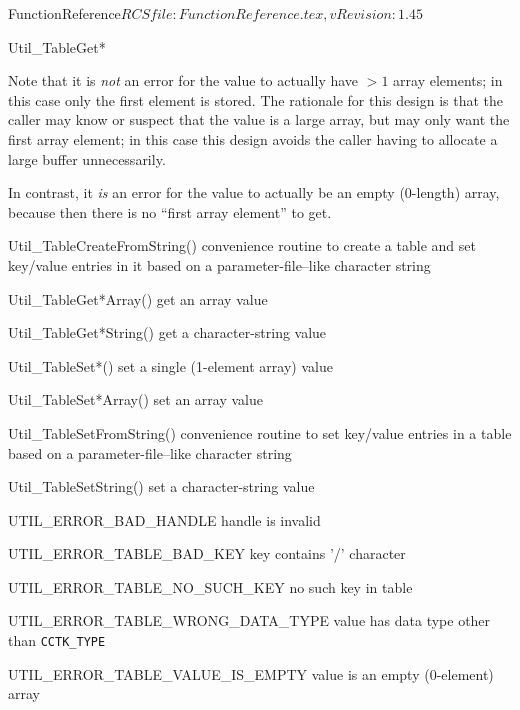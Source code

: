 \begin{cactuspart}{5}{FunctionReference}{$RCSfile: FunctionReference.tex,v $}{$Revision: 1.45 $}
\begin{FunctionDescription}{Util\_TableGet*}
\begin{Discussion}
Note that it is {\em not\/} an error for the value to actually have
$> 1$ array elements; in this case only the first element is stored.
The rationale for this design is that the caller may know or suspect
that the value is a large array, but may only want the first array
element; in this case this design avoids the caller having to allocate
a large buffer unnecessarily.

In contrast, it {\em is\/} an error for the value to actually be
an empty (0-length) array, because then there is no ``first array element''
to get.
\end{Discussion}

\begin{SeeAlso}{Util\_TableCreateFromString()}
convenience routine to create a table and set key/value entries
in it based on a parameter-file--like character string
\end{SeeAlso}
\begin{SeeAlso}{Util\_TableGet*Array()}
get an array value
\end{SeeAlso}
\begin{SeeAlso}{Util\_TableGet*String()}
get a character-string value
\end{SeeAlso}
\begin{SeeAlso}{Util\_TableSet*()}
set a single (1-element array) value
\end{SeeAlso}
\begin{SeeAlso}{Util\_TableSet*Array()}
set an array value
\end{SeeAlso}
\begin{SeeAlso}{Util\_TableSetFromString()}
convenience routine to set key/value entries in a table based on a
parameter-file--like character string
\end{SeeAlso}
\begin{SeeAlso}{Util\_TableSetString()}
set a character-string value
\end{SeeAlso}

\begin{Error}{UTIL\_ERROR\_BAD\_HANDLE}
handle is invalid
\end{Error}
\begin{Error}{UTIL\_ERROR\_TABLE\_BAD\_KEY}
key contains '/' character
\end{Error}
\begin{Error}{UTIL\_ERROR\_TABLE\_NO\_SUCH\_KEY}
no such key in table
\end{Error}
\begin{Error}{UTIL\_ERROR\_TABLE\_WRONG\_DATA\_TYPE}
value has data type other than \verb|CCTK_TYPE|
\end{Error}
\begin{Error}{UTIL\_ERROR\_TABLE\_VALUE\_IS\_EMPTY}
value is an empty (0-element) array
\end{Error}


\end{FunctionDescription}
\end{cactuspart}
